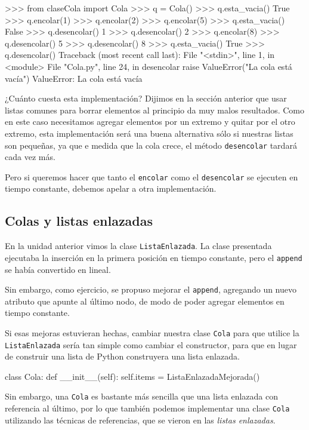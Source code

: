 \begin{codigo-python-sn}
>>> from claseCola import Cola
>>> q = Cola()
>>> q.esta_vacia()
True
>>> q.encolar(1)
>>> q.encolar(2)
>>> q.encolar(5)
>>> q.esta_vacia()
False
>>> q.desencolar()
1
>>> q.desencolar()
2
>>> q.encolar(8)
>>> q.desencolar()
5
>>> q.desencolar()
8
>>> q.esta_vacia()
True
>>> q.desencolar()
Traceback (most recent call last):
  File "<stdin>", line 1, in <module>
  File "Cola.py", line 24, in desencolar
    raise ValueError("La cola está vacía")
ValueError: La cola está vacía
\end{codigo-python-sn}

¿Cuánto cuesta esta implementación?  Dijimos en la sección anterior que
usar listas comunes para borrar elementos al principio da muy malos
resultados. Como en este caso necesitamos agregar elementos por un extremo
y quitar por el otro extremo, esta implementación será una buena
alternativa sólo si nuestras listas son pequeñas, ya que e medida que la
cola crece, el método \lstinline!desencolar! tardará cada vez más.

Pero si queremos hacer que tanto el \lstinline!encolar! como el
\lstinline!desencolar!  se ejecuten en tiempo constante, debemos apelar a
otra implementación.

\subsection{Colas y listas enlazadas}

En la unidad anterior vimos la clase \lstinline!ListaEnlazada!.
La clase presentada ejecutaba la inserción en la primera posición en
tiempo constante, pero el \lstinline|append| se había convertido en lineal.

Sin embargo, como ejercicio, se propuso mejorar el \lstinline|append|,
agregando un nuevo atributo que apunte al último nodo, de modo de poder
agregar elementos en tiempo constante.

Si esas mejoras estuvieran hechas, cambiar nuestra clase \lstinline!Cola!
para que utilice la \lstinline!ListaEnlazada! sería tan simple como cambiar
el constructor, para que en lugar de construir una lista de Python
construyera una lista enlazada.

\begin{codigo-python-sn}
class Cola:
    def __init__(self):
        self.items = ListaEnlazadaMejorada()
\end{codigo-python-sn}

Sin embargo, una \lstinline!Cola! es bastante más sencilla que una
lista enlazada con referencia al último, por lo que también podemos
implementar una clase \lstinline!Cola! utilizando las técnicas de referencias,
que se vieron en las \emph{listas enlazadas}.


